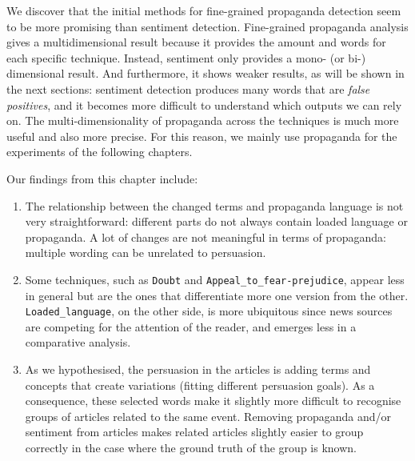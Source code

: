 We discover that
the initial methods for fine-grained propaganda detection seem to be more promising %
than sentiment detection.
Fine-grained propaganda analysis gives a multidimensional result because it provides the amount and words for each specific technique. Instead, sentiment only provides a mono- (or bi-) dimensional result. And furthermore, it shows weaker results, as will be shown in the next sections: sentiment detection produces many words that are \emph{false positives}, and it becomes more difficult to understand which outputs we can rely on.
The multi-dimensionality of propaganda across the techniques is much more useful and also more precise.
For this reason, we mainly use propaganda for the experiments of the following chapters. 

Our findings from this chapter include:
\begin{enumerate}
    \item The relationship between the changed terms and propaganda language is not very straightforward: different parts do not always contain loaded language or propaganda. A lot of changes are not meaningful in terms of propaganda: multiple wording can be unrelated to persuasion. %
    \item Some techniques, such as \texttt{Doubt} and \texttt{Appeal\_to\_fear-prejudice}, appear less in general but are the ones that differentiate more one version from the other. \texttt{Loaded\_language}, on the other side, is more ubiquitous since news sources are competing for the attention of the reader, and emerges less in a comparative analysis.
    \item As we hypothesised, the persuasion in the articles is adding terms and concepts that create variations (fitting different persuasion goals). As a consequence, these selected words make it slightly more difficult to recognise groups of articles related to the same event.
    Removing propaganda and/or sentiment from articles makes related articles slightly easier to group correctly in the case where the ground truth of the group is known.%
\end{enumerate}

